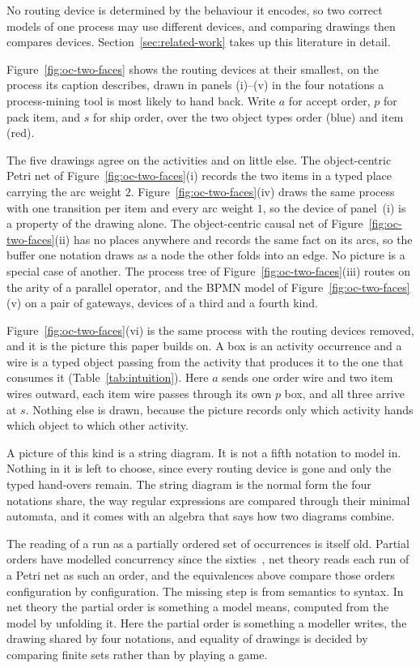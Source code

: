No routing device is
determined by the behaviour it encodes, so two correct models of one process may use different
devices, and comparing drawings then compares devices. Section~\ref{sec:related-work} takes up
this literature in detail.

Figure~\ref{fig:oc-two-faces} shows the routing devices at their smallest, on the process its
caption describes, drawn in panels (i)--(v) in the four notations a process-mining tool is most
likely to hand back. Write $a$ for accept order, $p$ for pack item,
and $s$ for ship order, over the two object types $\mathrm{order}$ (blue) and
$\mathrm{item}$ (red).

The five drawings agree on the activities and on little else. The object-centric Petri net of
Figure~\ref{fig:oc-two-faces}(i) records the two items in a typed place carrying the arc weight
$2$. Figure~\ref{fig:oc-two-faces}(iv) draws the same process with one transition per item and
every arc weight $1$, so the device of panel~(i) is a property of the drawing alone.
The object-centric causal net of Figure~\ref{fig:oc-two-faces}(ii) has no places anywhere and
records the same fact on its arcs, so the buffer one notation draws as a node the other folds into
an edge. No picture is a special case of another. The process tree of
Figure~\ref{fig:oc-two-faces}(iii) routes on the arity of a parallel operator, and the BPMN model
of Figure~\ref{fig:oc-two-faces}(v) on a pair of gateways, devices of a third and a fourth kind.

Figure~\ref{fig:oc-two-faces}(vi) is the same process with the routing devices removed, and it is
the picture this paper builds on. A box is an activity occurrence and a wire is a typed object
passing from the activity that produces it to the one that consumes it
(Table~\ref{tab:intuition}). Here $a$ sends one $\mathrm{order}$ wire and two $\mathrm{item}$ wires outward, each
$\mathrm{item}$ wire passes through its own $p$ box, and all three arrive at $s$. Nothing else is
drawn, because the picture records only which activity hands which object to which other activity.

A picture of this kind is a string diagram. It is not a fifth notation to model in.
Nothing in it is left to choose, since every routing device is gone and only the typed hand-overs
remain. The string diagram is the normal
form the four notations share, the way regular expressions are compared through their minimal
automata, and it comes with an algebra that says how two diagrams combine.

The reading of a run as a partially ordered set of occurrences is itself old. Partial orders have
modelled concurrency since the sixties~\cite{prattModelingConcurrencyPartial1986}, net theory
reads each run of a Petri net as such an order, and the equivalences above compare those orders
configuration by configuration. The missing step is from semantics to syntax. In net theory the
partial order is something a model means, computed from the model by unfolding it. Here the partial order is
something a modeller writes, the drawing shared by four notations, and equality of drawings is
decided by comparing finite sets rather than by playing a game.

